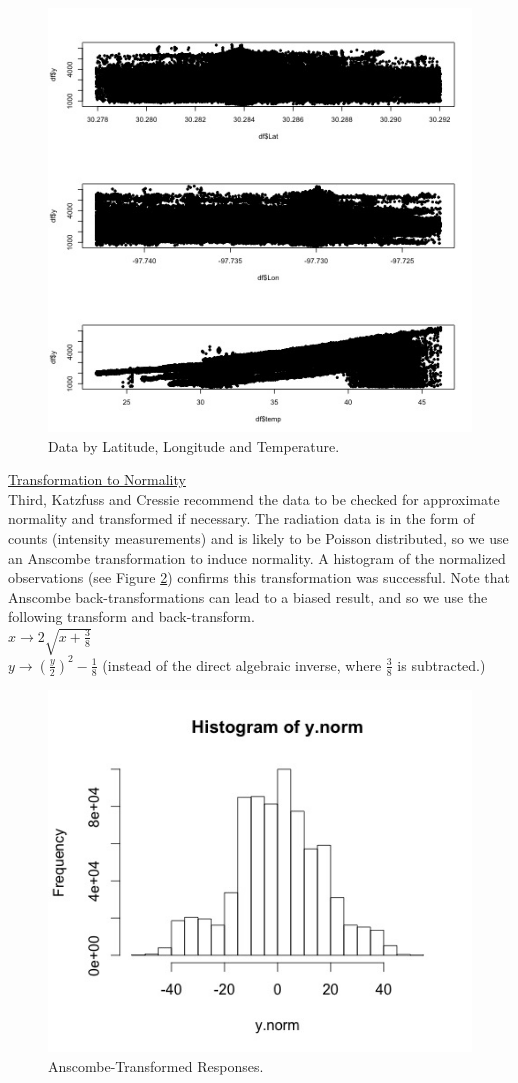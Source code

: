 \documentclass[11pt]{article}
\newcommand{\myindent}{\hspace*{1cm}}
\begin{document}
\begin{figure}[H]
\centering
\includegraphics[width=0.45\columnwidth]{Images/detrending_plots.jpg}
\caption{Data by Latitude, Longitude and Temperature.}
\label{fig:2}
\end{figure}

\underline{Transformation to Normality}\\
Third, Katzfuss and Cressie recommend the data to be checked for approximate normality and transformed if necessary.  The radiation data is in the form of counts (intensity measurements) and is likely to be Poisson distributed, so we use an Anscombe transformation to induce normality.  A histogram of the normalized observations (see Figure \ref{fig:3}) confirms this transformation was successful.  Note that Anscombe back-transformations can lead to a biased result, and so we use the following transform and back-transform. \\

\myindent $x \rightarrow 2\sqrt{x + \frac{3}{8}}$\\
\myindent $y \rightarrow \left(\frac{y}{2}\right)^2 - \frac{1}{8}$ 
\myindent (instead of the direct algebraic inverse, where $\frac{3}{8}$ is subtracted.)

\begin{figure}[H]
\centering
\includegraphics[width=0.5\columnwidth]{Images/histogram_ynorm}
\caption{Anscombe-Transformed Responses.}
\label{fig:3}
\end{figure}
\end{document}

